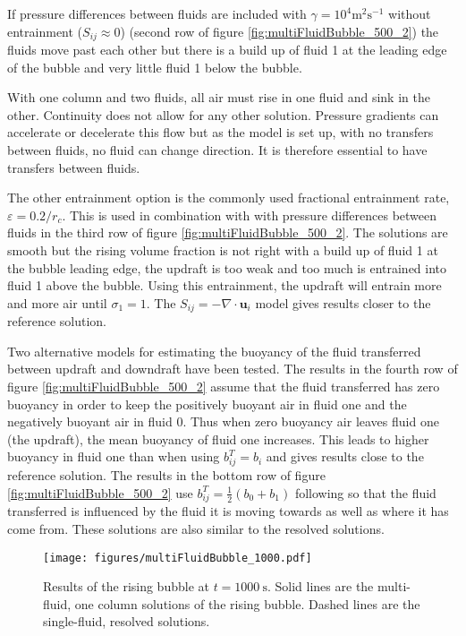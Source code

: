 \documentclass[draft]{agujournal2019}
\begin{document}
If
pressure differences between fluids are included
with $\gamma=10^{4}\text{m}^{2}\text{s}^{-1}$
without
entrainment ($S_{ij}\approx 0$) (second row of figure \ref{fig:multiFluidBubble_500_2})
the fluids move past each other but there is 
a build up of fluid 1 at the leading edge of the bubble and very little
fluid 1 below the bubble.

With one column and
two fluids, all air must rise in one fluid and sink in the other.
Continuity does not allow for any other solution. Pressure gradients
can accelerate or decelerate this flow but as the model is set up,
with no transfers between fluids, no fluid can change direction. It
is therefore essential to have transfers between fluids.

The other entrainment option is the commonly used fractional entrainment
rate, $\varepsilon=0.2/r_{c}$. This is used in combination with with pressure differences between fluids in the third row of figure \ref{fig:multiFluidBubble_500_2}.
The solutions are smooth
but the rising volume fraction is not right with a build up of fluid 1 at the bubble leading edge, the updraft is too
weak and too much is entrained into fluid 1 above the bubble.
Using this entrainment, the updraft will entrain more and more air until $\sigma_{1}=1$. The $S_{ij}=-\nabla\cdot\mathbf{u}_{i}$ model gives
results closer to the reference solution.

Two alternative models for estimating the buoyancy of the fluid transferred
between updraft and downdraft have been tested. The results in
the fourth row of figure \ref{fig:multiFluidBubble_500_2} assume that the fluid transferred has zero buoyancy in order to keep the
positively buoyant air in fluid one and the negatively buoyant air
in fluid 0. Thus when zero buoyancy air leaves fluid one (the updraft),
the mean buoyancy of fluid one increases. This leads to
higher buoyancy in fluid one than when using $b_{ij}^T=b_i$ and gives results close to the reference solution.
The results in the bottom row of figure \ref{fig:multiFluidBubble_500_2}
use $b_{ij}^{T}=\frac{1}{2}\left(b_{0}+b_{1}\right)$ following 
so that the fluid transferred is influenced by the fluid it is moving
towards as well as where it has come from. 
These solutions are also similar to the resolved solutions.





\begin{figure}
\noindent
\texttt{[image: figures/multiFluidBubble\_1000.pdf]}
\caption{\label{fig:multiFluidBubble_1000} Results of the rising bubble at $t=1000\ \text{s}$. Solid lines are the multi-fluid, one column solutions of the rising bubble. Dashed lines are the single-fluid, resolved solutions.
}
\end{figure}
\end{document}
